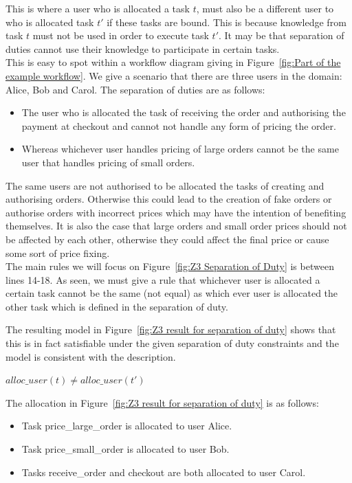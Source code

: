 \documentclass[a4paper]{report}
\begin{document}
This is where a user who is allocated a task $t$, must also be a different user to who is allocated task $t\ensuremath{'}$ if these tasks are bound. This is because knowledge from task $t$ must not be used in order to execute task $t\ensuremath{'}$. It may be that separation of duties cannot use their knowledge to participate in certain tasks.\\

This is easy to spot within a workflow diagram giving in Figure~\ref{fig:Part of the example workflow}. We give a scenario that there are three users in the domain: Alice, Bob and Carol. The separation of duties are as follows: 
\begin{itemize}
\item The user who is allocated the task of receiving the order and authorising the payment at checkout and cannot not handle any form of pricing the order.
\item Whereas whichever user handles pricing of large orders cannot be the same user that handles pricing of small orders.
\end{itemize}
The same users are not authorised to be allocated the tasks of creating and authorising orders. Otherwise this could lead to the creation of fake orders or authorise orders with incorrect prices which may have the intention of benefiting themselves. It is also the case that large orders and small order prices should not be affected by each other, otherwise they could affect the final price or cause some sort of price fixing.\\

The main rules we will focus on Figure~\ref{fig:Z3 Separation of Duty} is between lines 14-18. As seen, we must give a rule that whichever user is allocated a certain task cannot be the same (not equal) as which ever user is allocated the other task which is defined in the separation of duty. 

The resulting model in Figure~\ref{fig:Z3 result for separation of duty} shows that this is in fact satisfiable under the given separation of duty constraints and the model is consistent with the description. 
\begin{center}
$alloc\_user(t) \neq alloc\_user(t\ensuremath{'})$
\end{center}
The allocation in Figure~\ref{fig:Z3 result for separation of duty} is as follows:
\begin{itemize}
\item Task price\_large\_order is allocated to user Alice.
\item Task price\_small\_order is allocated to user Bob.
\item Tasks receive\_order and checkout are both allocated to user Carol.
\end{itemize}
\end{document}
